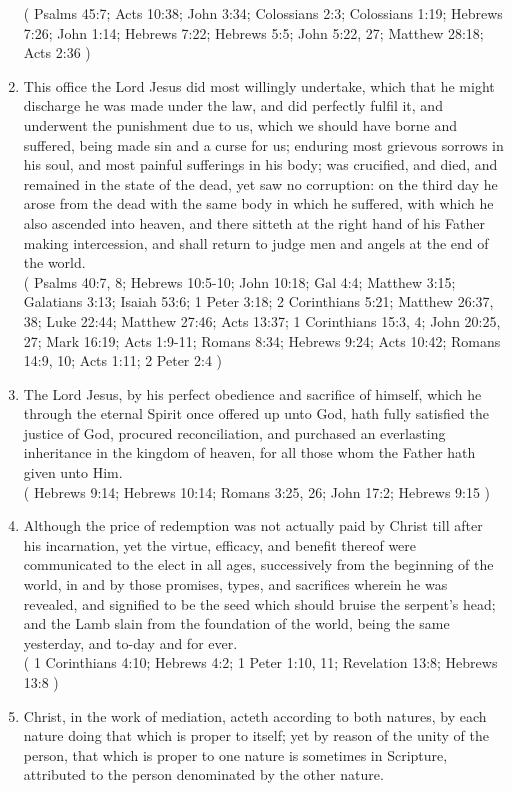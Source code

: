 \documentclass[12pt,a4paper]{book}
\begin{document}
\begin{enumerate}
( Psalms 45:7; Acts 10:38; John 3:34; Colossians 2:3; Colossians 1:19; Hebrews 7:26; John 1:14; Hebrews 7:22; Hebrews 5:5; John 5:22, 27; Matthew 28:18; Acts 2:36 )
\item
\label{ch-Chr-med-4}
This office the Lord Jesus did most willingly undertake, which that he might discharge he was made under the law, and did perfectly fulfil it, and underwent the punishment due to us, which we should have borne and suffered, being made sin and a curse for us; enduring most grievous sorrows in his soul, and most painful sufferings in his body; was crucified, and died, and remained in the state of the dead, yet saw no corruption: on the third day he arose from the dead with the same body in which he suffered, with which he also ascended into heaven, and there sitteth at the right hand of his Father making intercession, and shall return to judge men and angels at the end of the world.\\
( Psalms 40:7, 8; Hebrews 10:5-10; John 10:18; Gal 4:4; Matthew 3:15; Galatians 3:13; Isaiah 53:6; 1 Peter 3:18; 2 Corinthians 5:21; Matthew 26:37, 38; Luke 22:44; Matthew 27:46; Acts 13:37; 1 Corinthians 15:3, 4; John 20:25, 27; Mark 16:19; Acts 1:9-11; Romans 8:34; Hebrews 9:24; Acts 10:42; Romans 14:9, 10; Acts 1:11; 2 Peter 2:4 )
\item
\label{ch-Chr-med-5}
The Lord Jesus, by his perfect obedience and sacrifice of himself, which he through the eternal Spirit once offered up unto God, hath fully satisfied the justice of God, procured reconciliation, and purchased an everlasting inheritance in the kingdom of heaven, for all those whom the Father hath given unto Him.\\
( Hebrews 9:14; Hebrews 10:14; Romans 3:25, 26; John 17:2; Hebrews 9:15 )
\item
\label{ch-Chr-med-6}
Although the price of redemption was not actually paid by Christ till after his incarnation, yet the virtue, efficacy, and benefit thereof were communicated to the elect in all ages, successively from the beginning of the world, in and by those promises, types, and sacrifices wherein he was revealed, and signified to be the seed which should bruise the serpent's head; and the Lamb slain from the foundation of the world, being the same yesterday, and to-day and for ever.\\
( 1 Corinthians 4:10; Hebrews 4:2; 1 Peter 1:10, 11; Revelation 13:8; Hebrews 13:8 )
\item
\label{ch-Chr-med-7}
Christ, in the work of mediation, acteth according to both natures, by each nature doing that which is proper to itself; yet by reason of the unity of the person, that which is proper to one nature is sometimes in Scripture, attributed to the person denominated by the other nature.\\

\end{enumerate}
\end{document}
